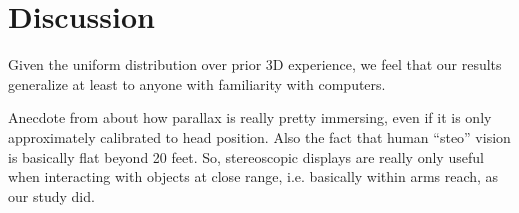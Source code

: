 \section{Discussion}\label{sec:discussion}

Given the uniform distribution over prior 3D experience, we feel that our
results generalize at least to anyone with familiarity with computers.

Anecdote from \cite{leewii} about how parallax is really pretty immersing,
even if it is only approximately calibrated to head position.  Also the fact
that human ``steo'' vision is basically flat beyond 20 feet.  So, stereoscopic
displays are really only useful when interacting with objects at close range,
i.e. basically within arms reach, as our study did.



